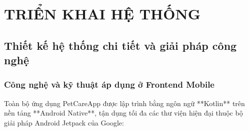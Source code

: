 \chapter{TRIỂN KHAI HỆ THỐNG}
\label{chap:trien_khai}

\section{Thiết kế hệ thống chi tiết và giải pháp công nghệ}
\label{sec:thiet_ke_chi_tiet}

\subsection{Công nghệ và kỹ thuật áp dụng ở Frontend Mobile}
\label{subsec:cong_nghe_frontend}

Toàn bộ ứng dụng PetCareApp được lập trình bằng ngôn ngữ **Kotlin** trên nền tảng **Android Native**, tận dụng tối đa các thư viện hiện đại thuộc bộ giải pháp Android Jetpack của Google:

